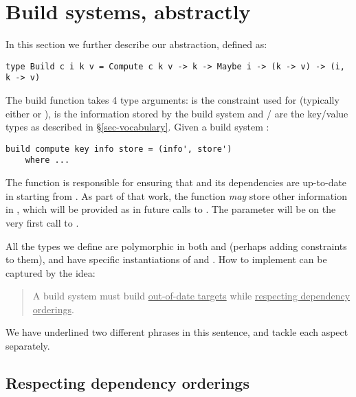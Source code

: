 \section{Build systems, abstractly}\label{sec-build}

In this section we further describe our  abstraction, defined as:

\begin{verbatim}
type Build c i k v = Compute c k v -> k -> Maybe i -> (k -> v) -> (i, k -> v)
\end{verbatim}

The build function takes 4 type arguments:  is the constraint used for  (typically either  or ),  is the information stored by the build system and / are the key/value types as described in \S\ref{sec-vocabulary}. Given a build system :

\begin{verbatim}
build compute key info store = (info', store')
    where ...
\end{verbatim}

The function  is responsible for ensuring that  and its dependencies are up-to-date in  starting from . As part of that work, the  function \textit{may} store other information in , which will be provided as  in future calls to . The  parameter will be  on the very first call to .

All the  types we define are polymorphic in both  and  (perhaps adding constraints to them), and have specific instantiations of  and . How to implement  can be captured by the idea:

\begin{quote}
A build system must build \underline{out-of-date targets} while \underline{respecting dependency orderings}.
\end{quote}


We have underlined two different phrases in this sentence, and tackle each aspect separately.


\subsection{Respecting dependency orderings}

